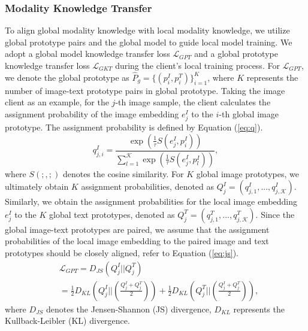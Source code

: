 \subsubsection{Modality Knowledge Transfer}\label{sec:modality_KT}


To align global modality knowledge with local modality knowledge, we utilize global prototype pairs and the global model to guide local model training.
We adopt a global model knowledge transfer loss $\mathcal L_{GPT}$ and a global prototype knowledge transfer loss $\mathcal L_{GKT}$ during the client's local training process.
For $\mathcal L_{GPT}$, we denote the global prototype as $\hat P_g = \{(p_i^I,p_i^T)\}_{i=1}^{K}$, where $K$ represents the number of image-text prototype pairs in global prototype.
Taking the image client as an example, for the $j$-th image sample, the client calculates the assignment probability of the image embedding $e_j^I$ to the $i$-th global image prototype. 
The assignment probability is defined by Equation (\ref{eq:q}).
\begin{equation}\label{eq:q}
    q_{j,i}^I = \frac{\exp(\frac{1}{\tau}S(e_j^I,p_i^I))}{\sum_{l=1}^{\mathcal K}\exp(\frac{1}{\tau}S(e_j^I,p_l^I))},
\end{equation}
where $S(;,;)$ denotes the cosine similarity. For $K$ global image prototypes, we ultimately obtain $K$ assignment probabilities, denoted as $Q_j^I=(q_{j,1}^I,...,q_{j,\mathcal K}^I)$.  Similarly, we obtain the assignment probabilities for the local image embedding $e_j^I$ to the $K$ global text prototypes, denoted as $Q_j^T=(q_{j,1}^T,...,q_{j,\mathcal K}^T)$.
Since the global image-text prototypes are paired, we assume that the assignment probabilities of the local image embedding to the paired image and text prototypes should be closely aligned, refer to Equation (\ref{eq:js}).
\begin{equation}
  \begin{aligned}\label{eq:js}
    &  \mathcal L_{GPT} = D_{JS}(Q_j^I||Q_j^T) \\
            & =\frac{1}{2}D_{KL}(Q_j^I||(\frac{Q_j^I+Q_j^T}{2}))  + \frac{1}{2}D_{KL}(Q_j^T||(\frac{Q_j^I+Q_j^T}{2})),
  \end{aligned} 
\end{equation}
where $D_{JS}$ denotes the Jensen-Shannon (JS) divergence, $D_{KL}$ represents the Kullback-Leibler (KL) divergence. 


